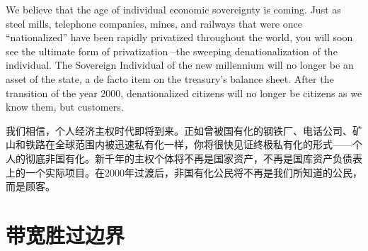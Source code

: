 \begin{Parallel}{97mm}{45mm}
  \ParallelPar  

  \ParallelLText
  {We believe that the age of individual economic sovereignty is coming. Just as steel mills, telephone companies, mines, and railways that were once “nationalized” have been rapidly privatized throughout the world, you will soon see the ultimate form of privatization --the sweeping denationalization of the individual. The Sovereign Individual of the new millennium will no longer be an asset of the state, a de facto item on the treasury's balance sheet. After the transition of the year 2000, denationalized citizens will no longer be citizens as we know them, but customers.}
  
  \ParallelRText
  {\small 我们相信，个人经济主权时代即将到来。正如曾被国有化的钢铁厂、电话公司、矿山和铁路在全球范围内被迅速私有化一样，你将很快见证终极私有化的形式——个人的彻底非国有化。新千年的主权个体将不再是国家资产，不再是国库资产负债表上的一个实际项目。在2000年过渡后，非国有化公民将不再是我们所知道的公民，而是顾客。}
 \ParallelPar


\section{带宽胜过边界}


\end{Parallel}
